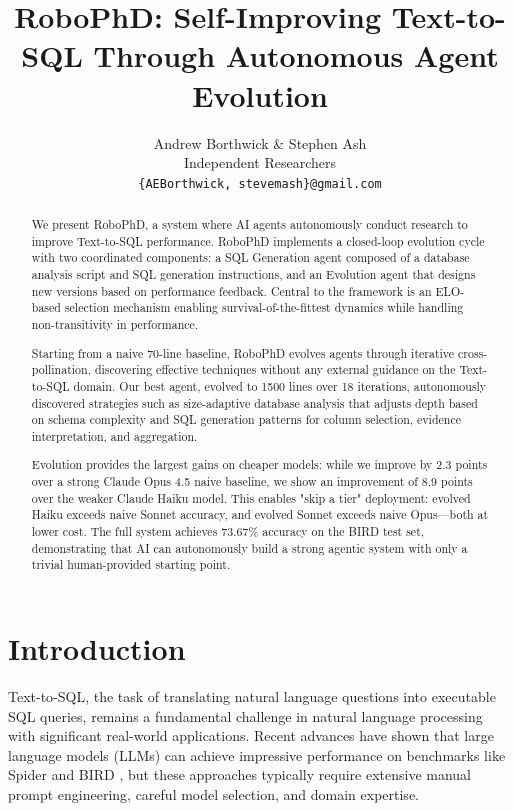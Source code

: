 \documentclass{article}
\title{RoboPhD: Self-Improving Text-to-SQL Through Autonomous Agent Evolution}
\author{Andrew Borthwick \& Stephen Ash \\
Independent Researchers\\
\texttt{\{AEBorthwick, stevemash\}@gmail.com}
}
\begin{document}
\maketitle

\begin{abstract}
We present RoboPhD, a system where AI agents autonomously conduct research to improve Text-to-SQL performance. RoboPhD implements a closed-loop evolution cycle with two coordinated components: a SQL Generation agent composed of a database analysis script and SQL generation instructions, and an Evolution agent that designs new versions based on performance feedback. Central to the framework is an ELO-based selection mechanism enabling survival-of-the-fittest dynamics while handling non-transitivity in performance.

Starting from a naive 70-line baseline, RoboPhD evolves agents through iterative cross-pollination, discovering effective techniques without any external guidance on the Text-to-SQL domain. Our best agent, evolved to 1500 lines over 18 iterations, autonomously discovered strategies such as size-adaptive database analysis that adjusts depth based on schema complexity and SQL generation patterns for column selection, evidence interpretation, and aggregation.

Evolution provides the largest gains on cheaper models: while we improve by 2.3 points over a strong Claude Opus 4.5 naive baseline, we show an improvement of 8.9 points over the weaker Claude Haiku model. This enables "skip a tier" deployment: evolved Haiku exceeds naive Sonnet accuracy, and evolved Sonnet exceeds naive Opus—both at lower cost.
The full system achieves 73.67\% accuracy on the BIRD test set, demonstrating that AI can autonomously build a strong agentic system with only a trivial human-provided starting point.
\end{abstract}

\section{Introduction}
\label{sec:intro}

Text-to-SQL, the task of translating natural language questions into executable SQL queries, remains a fundamental challenge in natural language processing with significant real-world applications. 
Recent advances have shown that large language models (LLMs) can achieve impressive performance on benchmarks like Spider \citep{spider2018} and BIRD \citep{bird2023}, but these approaches typically require extensive manual prompt engineering, careful model selection, and domain expertise.
\end{document}
